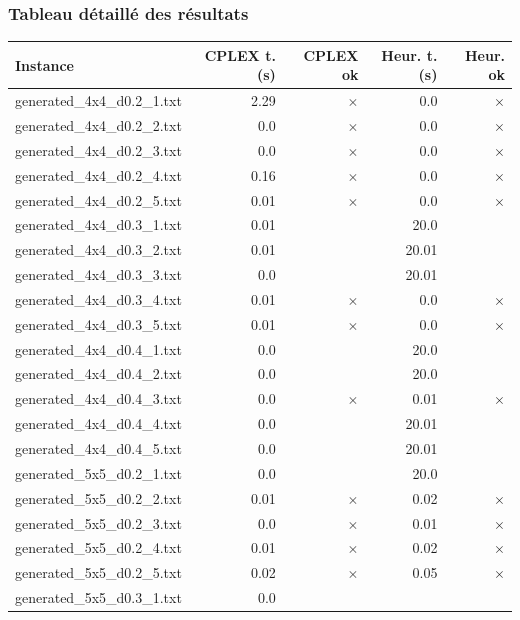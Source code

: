 \subsubsection{Tableau détaillé des résultats}
\begin{center}
\scriptsize
\renewcommand{\arraystretch}{1.05}
\begin{tabular}{lrrrr}
\hline
\textbf{Instance} & \textbf{CPLEX t. (s)} & \textbf{CPLEX ok} & \textbf{Heur. t. (s)} & \textbf{Heur. ok} \\
\hline
generated\_4x4\_d0.2\_1.txt & 2.29 & 
$\times$
 & 0.0 & 
$\times$
\\
generated\_4x4\_d0.2\_2.txt & 0.0 & 
$\times$
 & 0.0 & 
$\times$
\\
generated\_4x4\_d0.2\_3.txt & 0.0 & 
$\times$
 & 0.0 & 
$\times$
\\
generated\_4x4\_d0.2\_4.txt & 0.16 & 
$\times$
 & 0.0 & 
$\times$
\\
generated\_4x4\_d0.2\_5.txt & 0.01 & 
$\times$
 & 0.0 & 
$\times$
\\
generated\_4x4\_d0.3\_1.txt & 0.01 & 
 & 20.0 & 
\\
generated\_4x4\_d0.3\_2.txt & 0.01 & 
 & 20.01 & 
\\
generated\_4x4\_d0.3\_3.txt & 0.0 & 
 & 20.01 & 
\\
generated\_4x4\_d0.3\_4.txt & 0.01 & 
$\times$
 & 0.0 & 
$\times$
\\
generated\_4x4\_d0.3\_5.txt & 0.01 & 
$\times$
 & 0.0 & 
$\times$
\\
generated\_4x4\_d0.4\_1.txt & 0.0 & 
 & 20.0 & 
\\
generated\_4x4\_d0.4\_2.txt & 0.0 & 
 & 20.0 & 
\\
generated\_4x4\_d0.4\_3.txt & 0.0 & 
$\times$
 & 0.01 & 
$\times$
\\
generated\_4x4\_d0.4\_4.txt & 0.0 & 
 & 20.01 & 
\\
generated\_4x4\_d0.4\_5.txt & 0.0 & 
 & 20.01 & 
\\
generated\_5x5\_d0.2\_1.txt & 0.0 & 
 & 20.0 & 
\\
generated\_5x5\_d0.2\_2.txt & 0.01 & 
$\times$
 & 0.02 & 
$\times$
\\
generated\_5x5\_d0.2\_3.txt & 0.0 & 
$\times$
 & 0.01 & 
$\times$
\\
generated\_5x5\_d0.2\_4.txt & 0.01 & 
$\times$
 & 0.02 & 
$\times$
\\
generated\_5x5\_d0.2\_5.txt & 0.02 & 
$\times$
 & 0.05 & 
$\times$
\\
generated\_5x5\_d0.3\_1.txt & 0.0 & 

\end{tabular}
\end{center}
